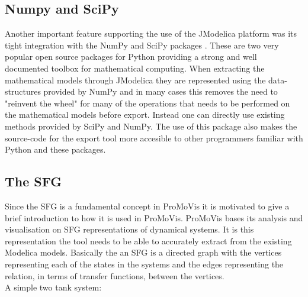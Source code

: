 \subsection{Numpy and SciPy}
Another important feature supporting the use of the JModelica platform was its tight integration with the NumPy and SciPy packages \cite{scipyorg}\nocite{*}. These are two very popular open source packages for Python providing a strong and well documented toolbox for mathematical computing. When extracting the mathematical models through JModelica they are represented using the data-structures provided by NumPy and in many cases this removes the need to "reinvent the wheel" for many of the operations that needs to be performed on the mathematical models before export. Instead one can directly use existing methods provided by SciPy and NumPy. The use of this package also makes the source-code for the export tool more accesible to other programmers familiar with Python and these packages.
\subsection{The SFG}
Since the SFG is a fundamental concept in ProMoVis it is motivated to give a brief introduction to how it is used in ProMoVis. ProMoVis bases its analysis and visualisation on SFG representations of dynamical systems. It is this representation the tool needs to be able to accurately extract from the existing Modelica models. Basically the an SFG is a directed graph with the vertices representing each of the states in the systems and the edges representing the relation, in terms of transfer functions, between the vertices.\\\newline A simple two tank system:

